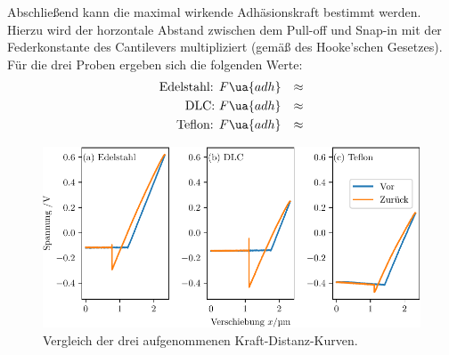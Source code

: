 Abschließend kann die maximal wirkende Adhäsionskraft bestimmt werden. Hierzu wird der horzontale
Abstand zwischen dem Pull-off und Snap-in mit der Federkonstante des Cantilevers multipliziert (gemäß des Hooke'schen Gesetzes).
Für die drei Proben ergeben sich die folgenden Werte:
\begin{align}
  \begin{aligned}
    \text{Edelstahl: } & F\ua{adh} &\approx \\
    \text{DLC: } & F\ua{adh}       &\approx \\
    \text{Teflon: } & F\ua{adh}    &\approx
  \end{aligned}
\end{align}

\begin{figure}
  \centering
  \includegraphics[scale = 1]{../analysis/data/force_distance/force_distance.pdf}
  \caption{Vergleich der drei aufgenommenen Kraft-Distanz-Kurven.}
  \label{fig: force_distance}
\end{figure}
